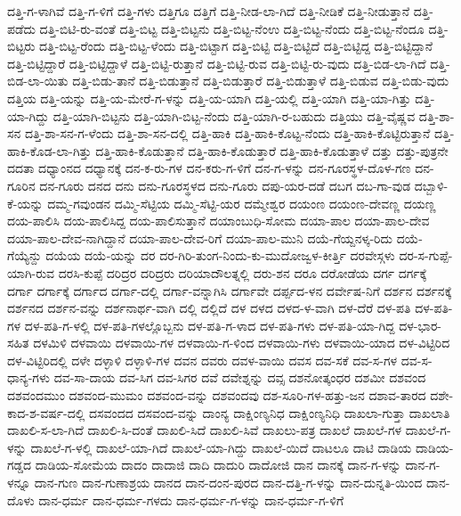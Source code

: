 ದತ್ತಿ-ಗ-ಳಾಗಿವೆ
ದತ್ತಿ-ಗ-ಳಿಗೆ
ದತ್ತಿ-ಗಳು
ದತ್ತಿಗೂ
ದತ್ತಿಗೆ
ದತ್ತಿ-ನೀಡ-ಲಾ-ಗಿದೆ
ದತ್ತಿ-ನೀಡಿಕೆ
ದತ್ತಿ-ನೀಡುತ್ತಾನೆ
ದತ್ತಿ-ಪಡೆದು
ದತ್ತಿ-ಬಿಟಿ-ರು-ವಂತೆ
ದತ್ತಿ-ಬಿಟ್ಟ
ದತ್ತಿ-ಬಿಟ್ಟನು
ದತ್ತಿ-ಬಿಟ್ಟ-ನೆಂಉ
ದತ್ತಿ-ಬಿಟ್ಟ-ನೆಂದು
ದತ್ತಿ-ಬಿಟ್ಟ-ನೆಂದೂ
ದತ್ತಿ-ಬಿಟ್ಟರು
ದತ್ತಿ-ಬಿಟ್ಟ-ರೆಂದು
ದತ್ತಿ-ಬಿಟ್ಟ-ಳೆಂದು
ದತ್ತಿ-ಬಿಟ್ಟಾಗ
ದತ್ತಿ-ಬಿಟ್ಟಿ
ದತ್ತಿ-ಬಿಟ್ಟಿದೆ
ದತ್ತಿ-ಬಿಟ್ಟಿದ್ದ
ದತ್ತಿ-ಬಿಟ್ಟಿದ್ದಾನೆ
ದತ್ತಿ-ಬಿಟ್ಟಿದ್ದಾರೆ
ದತ್ತಿ-ಬಿಟ್ಟಿದ್ದಾಳೆ
ದತ್ತಿ-ಬಿಟ್ಟಿ-ರುತ್ತಾನೆ
ದತ್ತಿ-ಬಿಟ್ಟಿ-ರುವ
ದತ್ತಿ-ಬಿಟ್ಟಿ-ರು-ವುದು
ದತ್ತಿ-ಬಿಡ-ಲಾ-ಗಿದೆ
ದತ್ತಿ-ಬಿಡ-ಲಾ-ಯಿತು
ದತ್ತಿ-ಬಿಡು-ತಾನೆ
ದತ್ತಿ-ಬಿಡುತ್ತಾನೆ
ದತ್ತಿ-ಬಿಡುತ್ತಾರೆ
ದತ್ತಿ-ಬಿಡುತ್ತಾಳೆ
ದತ್ತಿ-ಬಿಡುವ
ದತ್ತಿ-ಬಿಡು-ವುದು
ದತ್ತಿಯ
ದತ್ತಿ-ಯನ್ನು
ದತ್ತಿ-ಯ-ಮೇರೆ-ಗ-ಳನ್ನು
ದತ್ತಿ-ಯ-ಯಾಗಿ
ದತ್ತಿ-ಯಲ್ಲಿ
ದತ್ತಿ-ಯಾಗಿ
ದತ್ತಿ-ಯಾ-ಗಿತ್ತು
ದತ್ತಿ-ಯಾ-ಗಿದ್ದು
ದತ್ತಿ-ಯಾಗಿ-ಬಿಟ್ಟನು
ದತ್ತಿ-ಯಾಗಿ-ಬಿಟ್ಟ-ನೆಂದು
ದತ್ತಿ-ಯಾಗಿ-ರ-ಬಹುದು
ದತ್ತಿಯು
ದತ್ತಿ-ವೈಷ್ಣವ
ದತ್ತಿ-ಶಾ-ಸನ
ದತ್ತಿ-ಶಾ-ಸನ-ಗ-ಳೆಂದು
ದತ್ತಿ-ಶಾ-ಸನ-ದಲ್ಲಿ
ದತ್ತಿ-ಹಾಕಿ
ದತ್ತಿ-ಹಾಕಿ-ಕೊಟ್ಟ-ನೆಂದು
ದತ್ತಿ-ಹಾಕಿ-ಕೊಟ್ಟಿರುತ್ತಾನೆ
ದತ್ತಿ-ಹಾಕಿ-ಕೊಡ-ಲಾ-ಗಿತ್ತು
ದತ್ತಿ-ಹಾಕಿ-ಕೊಡುತ್ತಾನೆ
ದತ್ತಿ-ಹಾಕಿ-ಕೊಡುತ್ತಾರೆ
ದತ್ತಿ-ಹಾಕಿ-ಕೊಡುತ್ತಾಳೆ
ದತ್ತು
ದತ್ತು-ಪುತ್ರನೇ
ದದತಾ
ದಧ್ಯಾಂನದ
ದಧ್ಯಾನಕ್ಕೆ
ದನ-ಕ-ರು-ಗಳ
ದನ-ಕರು-ಗ-ಳಿಗೆ
ದನ-ಗ-ಳನ್ನು
ದನ-ಗೂರಸ್ಥಳ-ದೊಳ-ಗಣ
ದನ-ಗೂರಿನ
ದನ-ಗೂರು
ದನದ
ದನು
ದನು-ಗೂರಸ್ಥಳದ
ದನು-ಗೂರು
ದಪು-ಯರ-ದಡೆ
ದಬಗ
ದಬ-ಗಾ-ವುಡ
ದಬ್ಬಾಳಿ-ಕೆ-ಯನ್ನು
ದಮ್ಮ-ಗವುಂಡನ
ದಮ್ಮಿ-ಸೆಟ್ಟಿಯ
ದಮ್ಮಿ-ಸೆಟ್ಟಿ-ಯರ
ದಮ್ಮೇಶ್ವರ
ದಯಂಣ
ದಯಂಣ-ದೇವಣ್ಣ
ದಯಣ್ಣ
ದಯ-ಪಾಲಿಸಿ
ದಯ-ಪಾಲಿಸಿದ್ದ
ದಯ-ಪಾಲಿಸುತ್ತಾನೆ
ದಯಾಂಬುಧಿ-ಸೋಮ
ದಯಾ-ಪಾಲ
ದಯಾ-ಪಾಲ-ದೇವ
ದಯಾ-ಪಾಲ-ದೇವ-ನಾಗಿದ್ದಾನೆ
ದಯಾ-ಪಾಲ-ದೇವ-ರಿಗೆ
ದಯಾ-ಪಾಲ-ಮುನಿ
ದಯೆ-ಗೆಯ್ದನಳ್ಕ-ರಿದು
ದಯೆ-ಗೆಯ್ಯೆನ್ದು
ದಯೆಯ
ದಯೆ-ಯನ್ನು
ದರ
ದರ-ಗಿರಿ-ತುಂಗ-ನಿಂದು-ಕು-ಮುದೋಜ್ವಳ-ಕೀರ್ತ್ತಿ
ದರವೇಸ್ಗಳು
ದರ-ಸ-ಗುಪ್ಪೆ-ಯಾಗಿ-ರುವ
ದರಸಿ-ಕುಪ್ಪೆ
ದರಿದ್ರರ
ದರಿದ್ರರು
ದರಿಯಾದೌಲತ್ನಲ್ಲಿ
ದರು-ಶನ
ದರೂ
ದರೋಡೆಯ
ದರ್ಗ
ದರ್ಗಕ್ಕೆ
ದರ್ಗಾ
ದರ್ಗಾಕ್ಕೆ
ದರ್ಗಾದ
ದರ್ಗಾ-ದಲ್ಲಿ
ದರ್ಗಾ-ವನ್ನಾಗಿಸಿ
ದರ್ಗಾವೇ
ದರ್ಪ್ಪದ-ಳನ
ದರ್ವೇಷ-ನಿಗೆ
ದರ್ಶನ
ದರ್ಶನಕ್ಕೆ
ದರ್ಶನದ
ದರ್ಶನ-ವನ್ನು
ದರ್ಶನಾರ್ಥ-ವಾಗಿ
ದಲ್ಲಿ
ದಲ್ಲಿದೆ
ದಳ
ದಳದ
ದಳದ-ಳ-ವಾಗಿ
ದಳ-ದೆರೆ
ದಳ-ಪತಿ
ದಳ-ಪತಿ-ಗಳ
ದಳ-ಪತಿ-ಗ-ಳಲ್ಲಿ
ದಳ-ಪತಿ-ಗಳಲ್ಲೊಬ್ಬನು
ದಳ-ಪತಿ-ಗ-ಳಾದ
ದಳ-ಪತಿ-ಗಳು
ದಳ-ಪತಿ-ಯಾ-ಗಿದ್ದ
ದಳ-ಭಾರ-ಸಹಿತ
ದಳಮಿಳಿ
ದಳವಾಯಿ
ದಳವಾಯಿ-ಗಳ
ದಳವಾಯಿ-ಗ-ಳಿಂದ
ದಳವಾಯಿ-ಗಳು
ದಳವಾಯಿ-ಯಾದ
ದಳ-ವಿಟ್ಟಿರಿದ
ದಳ-ವಿಟ್ಟಿರಿದಲ್ಲಿ
ದಳೇ
ದಳ್ಳಾಳಿ
ದಳ್ಳಾಳಿ-ಗಳ
ದವನ
ದವರು
ದವಳ-ವಾಯಿ
ದವಸ
ದವ-ಸಕೆ
ದವ-ಸ-ಗಳ
ದವ-ಸ-ಧಾನ್ಯ-ಗಳು
ದವ-ಸಾ-ದಾಯ
ದವ-ಸಿಗ
ದವ-ಸಿಗರ
ದವೆ
ದವೇಶ್ನನ್ನು
ದವ್ಸ
ದಶನೋತ್ಕಂಧರ
ದಶಮೀ
ದಶವಂದ
ದಶವಂದಮುಂ
ದಶವಂದ-ಮುಮಂ
ದಶವಂದ-ವನ್ನು
ದಶವಂದವು
ದಶ-ಸೂರಿ-ಗಳ-ಹತ್ತು-ಜನ
ದಶಾವ-ತಾರದ
ದಶೇ-ಕಾದ-ಶ-ವರ್ಷ-ದಲ್ಲಿ
ದಸವಂದದ
ದಸವಂದ-ವನ್ನು
ದಾಂನ್ಯ
ದಾಕ್ಷಿಂಣ್ಯನಿಧ
ದಾಕ್ಷಿಂಣ್ಯನಿಧಿ
ದಾಖಲಾ-ಗುತ್ತಾ
ದಾಖಲಾತಿ
ದಾಖಲಿ-ಸ-ಲಾ-ಗಿದೆ
ದಾಖಲಿ-ಸಿ-ದಂತೆ
ದಾಖಲಿ-ಸಿದೆ
ದಾಖಲಿ-ಸಿವೆ
ದಾಖಲು-ಪತ್ರ
ದಾಖಲೆ
ದಾಖಲೆ-ಗಳ
ದಾಖಲೆ-ಗ-ಳನ್ನು
ದಾಖಲೆ-ಗ-ಳಲ್ಲಿ
ದಾಖಲೆ-ಯಾ-ಗಿದೆ
ದಾಖಲೆ-ಯಾ-ಗಿದ್ದು
ದಾಖಲೆ-ಯಿದೆ
ದಾಟಲೂ
ದಾಟಿ
ದಾಡಿಯ
ದಾಡಿಯ-ಗಡ್ಡದ
ದಾಡಿಯ-ಸೋಮೆಯ
ದಾದಂ
ದಾದಾಜಿ
ದಾದಿ
ದಾದುರಿ
ದಾದೋಜಿ
ದಾನ
ದಾನಕ್ಕೆ
ದಾನ-ಗ-ಳನ್ನು
ದಾನ-ಗ-ಳನ್ನೂ
ದಾನ-ಗುಣ
ದಾನ-ಗುಣಾಶ್ರಯ
ದಾನದ
ದಾನ-ದಂನ-ಪುರದ
ದಾನ-ದತ್ತಿ-ಗ-ಳನ್ನು
ದಾನ-ದುನ್ನತಿ-ಯಿಂದ
ದಾನ-ದೊಳು
ದಾನ-ಧರ್ಮ
ದಾನ-ಧರ್ಮ-ಗಳದು
ದಾನ-ಧರ್ಮ-ಗ-ಳನ್ನು
ದಾನ-ಧರ್ಮ-ಗ-ಳಿಗೆ
